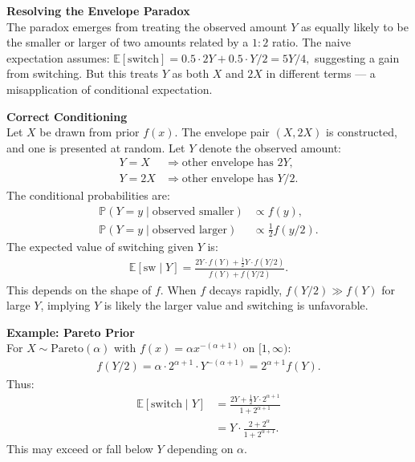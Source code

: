 \begin{technical}
{\Large\textbf{Resolving the Envelope Paradox}}\\[0.3em]

The paradox emerges from treating the observed amount $Y$ as equally likely to be the smaller or larger of two amounts related by a $1:2$ ratio. The naive expectation assumes: $
\mathbb{E}[\text{switch}] = 0.5 \cdot 2Y + 0.5 \cdot Y/2 = 5Y/4,$ suggesting a gain from switching. But this treats $Y$ as both $X$ and $2X$ in different terms — a misapplication of conditional expectation.

\textbf{Correct Conditioning}\\[0.2em]
Let $X$ be drawn from prior $f(x)$. The envelope pair $(X, 2X)$ is constructed, and one is presented at random. Let $Y$ denote the observed amount:
\begin{align*}
Y = X &\Rightarrow \text{other envelope has } 2Y,\\
Y = 2X &\Rightarrow \text{other envelope has } Y/2.
\end{align*}
The conditional probabilities are:
\begin{align*}
\mathbb{P}(Y=y \mid \text{observed smaller}) &\propto f(y), \\
\mathbb{P}(Y=y \mid \text{observed larger}) &\propto \tfrac{1}{2} f(y/2).
\end{align*}
The expected value of switching given $Y$ is:
\begin{align*}
\mathbb{E}[\text{sw} \mid Y] 
= \frac{2Y \cdot f(Y) + \tfrac{1}{2}Y \cdot f(Y/2)}{f(Y) + f(Y/2)}.
\end{align*}
This depends on the shape of $f$. When $f$ decays rapidly, $f(Y/2) \gg f(Y)$ for large $Y$, implying $Y$ is likely the larger value and switching is unfavorable.

\textbf{Example: Pareto Prior}\\[0.2em]
For $X \sim \text{Pareto}(\alpha)$ with $f(x) = \alpha x^{-(\alpha + 1)}$ on $[1, \infty)$:
\begin{align*}
f(Y/2) = \alpha \cdot 2^{\alpha + 1} \cdot Y^{-(\alpha + 1)} = 2^{\alpha + 1} f(Y).
\end{align*}
Thus:
\begin{align*}
\mathbb{E}[\text{switch} \mid Y] &= \frac{2Y + \tfrac{1}{2}Y \cdot 2^{\alpha + 1}}{1 + 2^{\alpha + 1}}\\
&= Y \cdot \frac{2 + 2^{\alpha}}{1 + 2^{\alpha + 1}}.
\end{align*}
This may exceed or fall below $Y$ depending on $\alpha$.


\end{technical}
